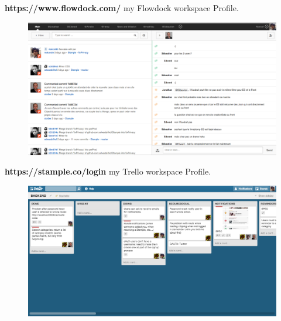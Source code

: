\documentclass[11pt]{article} %
\begin{document}
\textbf{https://www.flowdock.com/} my Flowdock workspace Profile.
\begin{figure}[H]
        \centering
                \centering
                \includegraphics[width=\textwidth]{Flowdock.png}
               
\end{figure}
\newpage
\textbf{https://stample.co/login} my Trello workspace Profile.
\begin{figure}[H]
        \centering
                \centering
                \includegraphics[width=\textwidth]{trello.png}
               
\end{figure}
\end{document}
